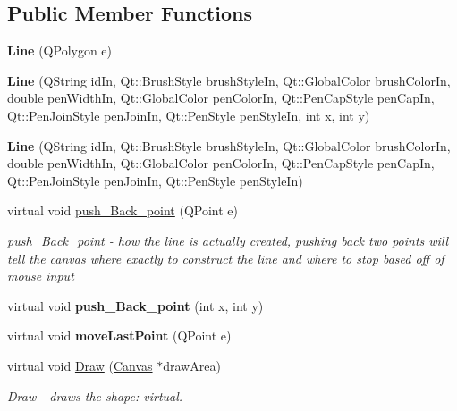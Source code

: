 \subsection*{Public Member Functions}
\begin{DoxyCompactItemize}
\item 
\mbox{\label{class_line_abad71cdf25c42d0794814bbfb4a21db8}} 
{\bfseries Line} (Q\+Polygon e)
\item 
\mbox{\label{class_line_ae007adde85949ea26e74987d09a7c3e5}} 
{\bfseries Line} (Q\+String id\+In, Qt\+::\+Brush\+Style brush\+Style\+In, Qt\+::\+Global\+Color brush\+Color\+In, double pen\+Width\+In, Qt\+::\+Global\+Color pen\+Color\+In, Qt\+::\+Pen\+Cap\+Style pen\+Cap\+In, Qt\+::\+Pen\+Join\+Style pen\+Join\+In, Qt\+::\+Pen\+Style pen\+Style\+In, int x, int y)
\item 
\mbox{\label{class_line_abf6160ef558a50fab058f2e33561a102}} 
{\bfseries Line} (Q\+String id\+In, Qt\+::\+Brush\+Style brush\+Style\+In, Qt\+::\+Global\+Color brush\+Color\+In, double pen\+Width\+In, Qt\+::\+Global\+Color pen\+Color\+In, Qt\+::\+Pen\+Cap\+Style pen\+Cap\+In, Qt\+::\+Pen\+Join\+Style pen\+Join\+In, Qt\+::\+Pen\+Style pen\+Style\+In)
\item 
virtual void \hyperlink{class_line_a01ac38eae66f157868daee1b4764b242}{push\+\_\+\+Back\+\_\+point} (Q\+Point e)
\begin{DoxyCompactList}\small\item\em push\+\_\+\+Back\+\_\+point -\/ how the line is actually created, pushing back two points will tell the canvas where exactly to construct the line and where to stop based off of mouse input \end{DoxyCompactList}\item 
\mbox{\label{class_line_a7f82d921d86db81eea79bd4f8452024c}} 
virtual void {\bfseries push\+\_\+\+Back\+\_\+point} (int x, int y)
\item 
\mbox{\label{class_line_af882f56947a1c83eaac5ce1d9e0088a8}} 
virtual void {\bfseries move\+Last\+Point} (Q\+Point e)
\item 
virtual void \hyperlink{class_line_ae645f8a7f03439fa3428f81b1ddb4ffc}{Draw} (\hyperlink{class_canvas}{Canvas} $\ast$draw\+Area)
\begin{DoxyCompactList}\small\item\em Draw -\/ draws the shape\+: virtual. \end{DoxyCompactList}\item 

\end{DoxyCompactItemize}
